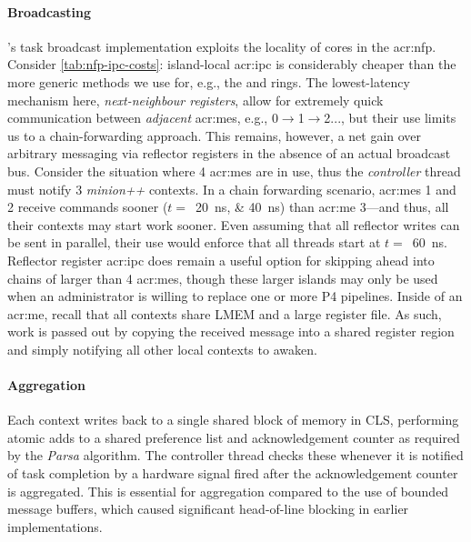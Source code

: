 \paragraph{Broadcasting}
\approachshort{}'s task broadcast implementation exploits the locality of cores in the \gls{acr:nfp}.
Consider \cref{tab:nfp-ipc-costs}: island-local \gls{acr:ipc} is considerably cheaper than the more generic methods we use for, e.g., the \inring{} and \outring{} rings.
The lowest-latency mechanism here, \emph{next-neighbour registers}, allow for extremely quick communication between \emph{adjacent} \glspl{acr:me}, e.g., 0$\rightarrow$1$\rightarrow$2..., but their use limits us to a chain-forwarding approach.
This remains, however, a net gain over arbitrary messaging via reflector registers in the absence of an actual broadcast bus.
Consider the situation where 4 \glspl{acr:me} are in use, thus the \emph{controller} thread must notify 3 \emph{minion++} contexts.
In a chain forwarding scenario, \glspl{acr:me} 1 and 2 receive commands sooner ($t=$~\qtylist{20; 40}{\nano\second}) than \gls{acr:me} 3---and thus, all their contexts may start work sooner.
Even assuming that all reflector writes can be sent in parallel, their use would enforce that all threads start at $t=$~\qty{60}{\nano\second}.
Reflector register \gls{acr:ipc} does remain a useful option for skipping ahead into chains of larger than 4 \glspl{acr:me}, though these larger islands may only be used when an administrator is willing to replace one or more P4 pipelines.
Inside of an \gls{acr:me}, recall that all contexts share LMEM and a large register file.
As such, work is passed out by copying the received message into a shared register region and simply notifying all other local contexts to awaken.

\paragraph{Aggregation}
Each context writes back to a single shared block of memory in CLS, performing atomic adds to a shared preference list and acknowledgement counter as required by the \emph{Parsa} algorithm.
The controller thread checks these whenever it is notified of task completion by a hardware signal fired after the acknowledgement counter is aggregated.
This is essential for aggregation compared to the use of bounded message buffers, which caused significant head-of-line blocking in earlier implementations.

